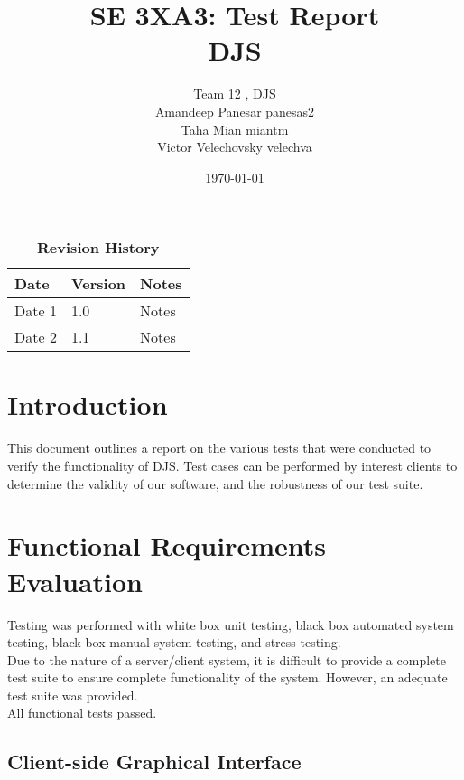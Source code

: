\documentclass[12pt, titlepage]{article}
\title{SE 3XA3: Test Report\\DJS}
\author{Team 12 , DJS
		\\ Amandeep Panesar panesas2
		\\ Taha Mian miantm
		\\ Victor Velechovsky velechva
}
\date{\today}
\begin{document}
\maketitle

\tableofcontents
\listoftables
\listoffigures

\begin{table}[H]
\caption{\bf Revision History}
\begin{tabularx}{\textwidth}{p{3cm}p{2cm}X}
\toprule {\bf Date} & {\bf Version} & {\bf Notes}\\
\midrule
Date 1 & 1.0 & Notes\\
Date 2 & 1.1 & Notes\\
\bottomrule
\end{tabularx}
\end{table}

\newpage


\section{Introduction}

This document outlines a report on the various tests that were conducted to verify the functionality of DJS. Test cases can be performed by interest clients to determine the validity of our software, and the robustness of our test suite.

\section{Functional Requirements Evaluation}
Testing was performed with white box unit testing, black box automated system testing, black box manual system testing, and stress testing.\\


Due to the nature of a server/client system, it is difficult to provide a complete test suite to ensure complete functionality of the system. However, an adequate test suite was provided. \\


All functional tests passed.


\subsection{Client-side Graphical Interface}
\end{document}

